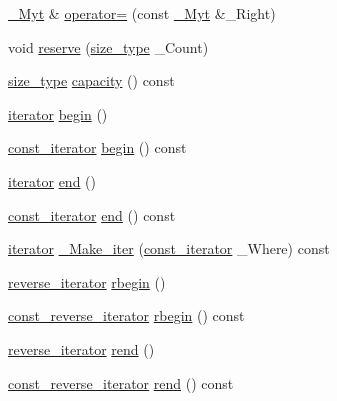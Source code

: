 \begin{DoxyCompactItemize}
\item 
\hyperlink{classvector_ae499c665535254a7364e3a219b780112}{\+\_\+\+Myt} \& \hyperlink{classvector_a5d402c01180b25eeb170866e2717b725}{operator=} (const \hyperlink{classvector_ae499c665535254a7364e3a219b780112}{\+\_\+\+Myt} \&\+\_\+\+Right)
\item 
void \hyperlink{classvector_a7428e66207efbf468e49651985a08c31}{reserve} (\hyperlink{classvector_ac975e84f5d6c2fe2267bb354a85818af}{size\+\_\+type} \+\_\+\+Count)
\item 
\hyperlink{classvector_ac975e84f5d6c2fe2267bb354a85818af}{size\+\_\+type} \hyperlink{classvector_a21c65889147afae2659222cd573aeb6e}{capacity} () const 
\item 
\hyperlink{classvector_a5a7a542bca0f55f43e161bd5a09c483d}{iterator} \hyperlink{classvector_a6efe00923de326e1661c331968658cf6}{begin} ()
\item 
\hyperlink{classvector_abed2910558c61a5a17113b2d250994da}{const\+\_\+iterator} \hyperlink{classvector_a7852e2f2214cf8b6c35cc37fd403ad3c}{begin} () const 
\item 
\hyperlink{classvector_a5a7a542bca0f55f43e161bd5a09c483d}{iterator} \hyperlink{classvector_aba1634590994c68b16af21735a4f541a}{end} ()
\item 
\hyperlink{classvector_abed2910558c61a5a17113b2d250994da}{const\+\_\+iterator} \hyperlink{classvector_a5ddbe02dc2954e254f93eb33dc03c9c8}{end} () const 
\item 
\hyperlink{classvector_a5a7a542bca0f55f43e161bd5a09c483d}{iterator} \hyperlink{classvector_a3957e92146489f5d04e5075dec2858cb}{\+\_\+\+Make\+\_\+iter} (\hyperlink{classvector_abed2910558c61a5a17113b2d250994da}{const\+\_\+iterator} \+\_\+\+Where) const 
\item 
\hyperlink{classvector_a40def3e50f68e742f5b0cc571eaf51eb}{reverse\+\_\+iterator} \hyperlink{classvector_a78f8334976fd4cb3954b1fe0833f7d90}{rbegin} ()
\item 
\hyperlink{classvector_aefbb12258ea747e127ef628e91e3c061}{const\+\_\+reverse\+\_\+iterator} \hyperlink{classvector_ae885bc2d89e2e938acf68437b618249b}{rbegin} () const 
\item 
\hyperlink{classvector_a40def3e50f68e742f5b0cc571eaf51eb}{reverse\+\_\+iterator} \hyperlink{classvector_ace499734c8f59823a305d8ee8355faf4}{rend} ()
\item 
\hyperlink{classvector_aefbb12258ea747e127ef628e91e3c061}{const\+\_\+reverse\+\_\+iterator} \hyperlink{classvector_a5d33de9ba4b238f1baeb6ae178d6725a}{rend} () const 
\item 

\end{DoxyCompactItemize}
